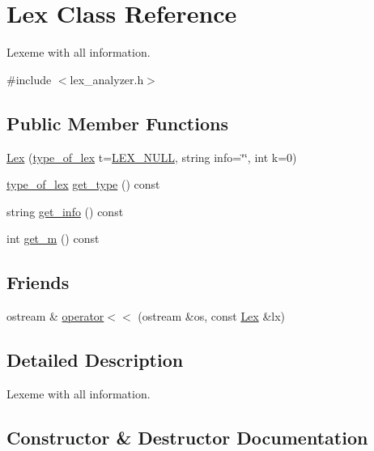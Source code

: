 \hypertarget{class_lex}{}\section{Lex Class Reference}
\label{class_lex}


Lexeme with all information.  




{\ttfamily \#include $<$lex\+\_\+analyzer.\+h$>$}

\subsection*{Public Member Functions}
\begin{DoxyCompactItemize}
\item 
\hyperlink{class_lex_af5c125b9b27809443e723373d39a0dd8}{Lex} (\hyperlink{lex__analyzer_8h_ace23631822b7d5734df5055ab6a9b27d}{type\+\_\+of\+\_\+lex} t=\hyperlink{lex__analyzer_8h_ace23631822b7d5734df5055ab6a9b27da292df6cba995f99f45847b05772ed297}{L\+E\+X\+\_\+\+N\+U\+LL}, string info=\char`\"{}\char`\"{}, int k=0)
\item 
\hyperlink{lex__analyzer_8h_ace23631822b7d5734df5055ab6a9b27d}{type\+\_\+of\+\_\+lex} \hyperlink{class_lex_a066448bfe205306722084723bb6e9cbf}{get\+\_\+type} () const 
\item 
string \hyperlink{class_lex_a9960d24508ea04e102661f5035c7c6ba}{get\+\_\+info} () const 
\item 
int \hyperlink{class_lex_a58274b3d661ac96e41311642b362e8ae}{get\+\_\+m} () const 
\end{DoxyCompactItemize}
\subsection*{Friends}
\begin{DoxyCompactItemize}
\item 
ostream \& \hyperlink{class_lex_aa4e3112dea3e781e04a3940762f963b4}{operator$<$$<$} (ostream \&os, const \hyperlink{class_lex}{Lex} \&lx)
\end{DoxyCompactItemize}


\subsection{Detailed Description}
Lexeme with all information. 

\subsection{Constructor \& Destructor Documentation}
